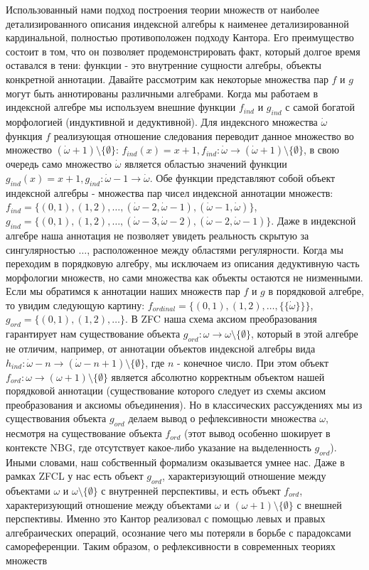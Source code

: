 \documentclass[12pt]{article}
\begin{document}
Использованный нами подход построения теории множеств от наиболее детализированного описания индексной алгебры к наименее детализированной кардинальной, полностью противоположен подходу Кантора. Его преимущество состоит в том, что он позволяет продемонстрировать факт, который долгое время оставался в тени: функции - это внутренние сущности алгебры, объекты конкретной аннотации. Давайте рассмотрим как некоторые множества пар $f$ и $g$ могут быть аннотированы различными алгебрами. Когда мы работаем в индексной алгебре мы используем внешние функции $f_{ind}$ и $g_{ind}$ с самой богатой морфологией (индуктивной и дедуктивной). Для индексного множества $\dot{\omega}$ функция $f$ реализующая отношение следования переводит данное множество во множество $(\dot{\omega} + 1) \setminus \{ \emptyset \}$: $f_{ind}(x) = x + 1, f_{ind} : \dot{\omega} \to (\dot{\omega} + 1) \setminus \{ \emptyset \}$, в свою очередь само множество $\dot{\omega}$ является областью значений функции $g_{ind}(x) = x + 1, g_{ind} : \dot{\omega} - 1 \to \dot{\omega}$. Обе функции представляют собой объект индексной алгебры - множества пар чисел индексной аннотации множеств: $f_{ind} = \{ (0, 1), (1, 2), \dots, (\dot{\omega} - 2, \dot{\omega} - 1), (\dot{\omega} - 1, \dot{\omega}) \}$, $g_{ind} = \{ (0, 1), (1, 2), \dots, (\dot{\omega} - 3, \dot{\omega} - 2), (\dot{\omega} - 2, \dot{\omega} - 1) \}$. Даже в индексной алгебре наша аннотация не позволяет увидеть реальность скрытую за сингулярностью $\dots$, расположенное между областями регулярности. Когда мы переходим в порядковую алгебру, мы исключаем из описания дедуктивную часть морфологии множеств, но сами множества как объекты остаются не низменными. Если мы обратимся к аннотации наших множеств пар $f$ и $g$ в порядковой алгебре, то увидим следующую картину: $f_{ordinal} = \{ (0, 1), (1, 2), \dots, \{ \{ \dot{\omega} \} \}\}$, $g_{ord} = \{ (0, 1), (1, 2), \dots \}$. В ZFC наша схема аксиом преобразования гарантирует нам существование объекта $g_{ord} : \omega \to \omega \setminus \{ \emptyset \}$, который в этой алгебре не отличим, например, от аннотации объектов индексной алгебры вида $h_{ind} : \dot{\omega} - n \to (\dot{\omega} - n + 1) \setminus \{ \emptyset \}$, где $n$ - конечное число. При этом объект $f_{ord} : \omega \to (\omega + 1) \setminus \{ \emptyset \}$ является абсолютно корректным объектом нашей порядковой аннотации (существование которого следует из схемы аксиом преобразования и аксиомы объединения). Но в классических рассуждениях мы из существования объекта $g_{ord}$ делаем вывод о рефлексивности множества $\omega$, несмотря на существование объекта $f_{ord}$ (этот вывод особенно шокирует в контексте NBG, где отсутствует какое-либо указание на выделенность $g_{ord}$). Иными словами, наш собственный формализм оказывается умнее нас. Даже в рамках ZFCL у нас есть объект $g_{ord}$, характеризующий отношение между объектами $\omega$ и $\omega \setminus \{ \emptyset \}$ с внутренней перспективы, и есть объект $f_{ord}$, характеризующий отношение между объектами $\omega$ и $(\omega + 1) \setminus \{ \emptyset \}$ с внешней перспективы. Именно это Кантор реализовал с помощью левых и правых алгебраических операций, осознание чего мы потеряли в борьбе с парадоксами самореференции. Таким образом, о рефлексивности в современных теориях множеств 
\end{document}
